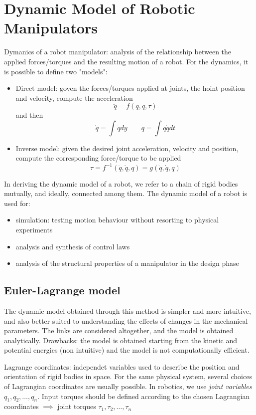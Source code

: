 \documentclass{book}
\begin{document}
\chapter{Dynamic Model of Robotic Manipulators}
Dymanics of a robot manipulator: analysis of the relationship between the applied forces/torques and the resulting motion of a robot. For the dynamics, it is possible to define two "models":
\begin{itemize}
    \item Direct model: goven the forces/torques applied at joints, the hoint position and velocity, compute the acceleration
        \[
            \ddot{q}=f(q,\dot{q},\tau)
        \]
        and then
        \[
            \dot{q}= \int \ddot{q} dy \qquad q= \int q \dot{q}dt
        \]
    \item Inverse model: given the desired joint acceleration, velocity and position, compute the corresponding force/torque to be applied
        \[
            \tau = f^{-1}(\ddot{q},\dot{q},q)=g(\ddot{q},\dot{q},q)
        \]
\end{itemize}
In deriving the dynamic model of a robot, we refer to a chain of rigid bodies mutually, and ideally, connected among them.
The dynamic model of a robot is used for:
\begin{itemize}
    \item simulation: testing motion behaviour without resorting to physical experiments
    \item analysis and synthesis of control laws
    \item analysis of the structural properties of a manipulator in the design phase
\end{itemize}



\section{Euler-Lagrange model}
The dynamic model obtained through this method is simpler and more intuitive, and also better suited to understanding the effects of changes in the mechanical parameters. The links are considered altogether, and the model is obtained analytically. Drawbacks: the model is obtained starting from the kinetic and potential energies (non intuitive) and the model is not computationally efficient.

Lagrange coordinates: independet variables used to describe the position and orientation of rigid bodies in space. For the same physical system, several choices of Lagrangian coordinates are usually possible. In robotics, we use \emph{joint variables} $q_1,q_2,\dots,q_n$. Input torques should be defined according to the chosen Lagrangian coordinates $\implies$ joint torques $\tau_1,\tau_2,\dots,\tau_n$ 
\end{document}
